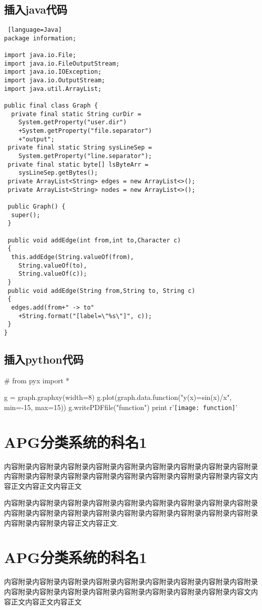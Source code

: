 \documentclass[utf8]{book}
\begin{document}
	\section{插入java代码}	
	\begin{lstlisting} [language=Java]
package information;

import java.io.File;
import java.io.FileOutputStream;
import java.io.IOException;
import java.io.OutputStream;
import java.util.ArrayList;

public final class Graph {
  private final static String curDir =
	System.getProperty("user.dir")
	+System.getProperty("file.separator")
	+"output";
 private final static String sysLineSep =
	System.getProperty("line.separator");
 private final static byte[] lsByteArr =
 	sysLineSep.getBytes();
 private ArrayList<String> edges = new ArrayList<>();
 private ArrayList<String> nodes = new ArrayList<>();

 public Graph() {
  super();
 }

 public void addEdge(int from,int to,Character c)
 {
  this.addEdge(String.valueOf(from),
  	String.valueOf(to), 
  	String.valueOf(c));
 }
 public void addEdge(String from,String to, String c)
 {
  edges.add(from+" -> to"
 	+String.format("[label=\"%s\"]", c));
 }
}

\end{lstlisting}
	
	\section{插入python代码}	
\begin{python}
#
from pyx import *
	
g = graph.graphxy(width=8)
g.plot(graph.data.function("y(x)=sin(x)/x", min=-15, max=15))
g.writePDFfile("function")
print r'\texttt{[image: function]}'
\end{python}
	\chapter{APG分类系统的科名1}	
	内容附录内容附录内容附录内容附录内容附录内容附录内容附录内容附录内容附录内容附录内容附录内容附录内容附录内容附录内容附录内容附录内容附录内容文内容正文内容正文内容正文
	
	内容附录内容附录内容附录内容附录内容附录内容附录内容附录内容附录内容附录内容附录内容附录内容附录内容附录内容附录内容附录内容附录内容附录内容附录内容附录内容附录内容正文内容正文\cite{DK1}.
	\chapter{APG分类系统的科名1}	
	内容附录内容附录内容附录内容附录内容附录内容附录内容附录内容附录内容附录内容附录内容附录内容附录内容附录内容附录内容附录内容附录内容附录内容文内容正文内容正文内容正文
	
\end{document}
